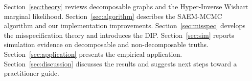 
Section~\ref{sec:theory} reviews decomposable graphs and the Hyper-Inverse Wishart marginal likelihood. Section~\ref{sec:algorithm} describes the SAEM-MCMC algorithm and our implementation improvements. Section~\ref{sec:misspec} develops the misspecification theory and introduces the DIP. Section~\ref{sec:sim} reports simulation evidence on decomposable and non-decomposable truths. Section~\ref{sec:application} presents the empirical application. Section~\ref{sec:discussion} discusses the results and suggests next steps toward a practitioner guide.
